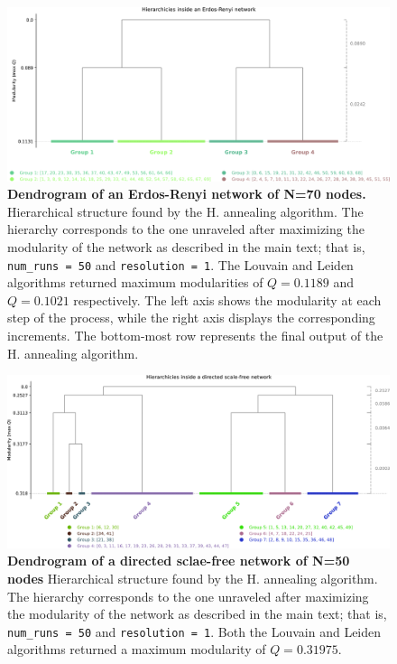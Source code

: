 \documentclass[pdflatex,sn-mathphys-num]{sn-jnl}%
\begin{document}
\begin{figure}[h]
    \centering
    \includegraphics[width=1\linewidth]{Figures/FigS5.pdf}
    \caption{\textbf{Dendrogram of an Erdos-Renyi network \cite{erdds1959random} of N=70 nodes.} Hierarchical structure found by the H. annealing algorithm. The hierarchy corresponds to the one unraveled after maximizing the modularity of the network as described in the main text; that is, {\tt num\_runs = 50} and {\tt resolution = 1}. The Louvain and Leiden algorithms returned maximum modularities of $Q=0.1189$ and $Q=0.1021$ respectively. The left axis shows the modularity at each step of the process, while the right axis displays the corresponding increments. The bottom-most row represents the final output of the H. annealing algorithm.}
    \label{fig:dendro_er}
\end{figure}

\begin{figure}[h]
    \centering
    \includegraphics[width=1\linewidth]{Figures/FigS6.pdf}
    \caption{\textbf{Dendrogram of a directed sclae-free network \cite{bollobas2003} of N=50 nodes} Hierarchical structure found by the H. annealing algorithm. The hierarchy corresponds to the one unraveled after maximizing the modularity of the network as described in the main text; that is, {\tt num\_runs = 50} and {\tt resolution = 1}. Both the Louvain and Leiden algorithms returned a maximum modularity of $Q=0.31975$.}
    \label{fig:dendro_sf}
\end{figure}
\end{document}
